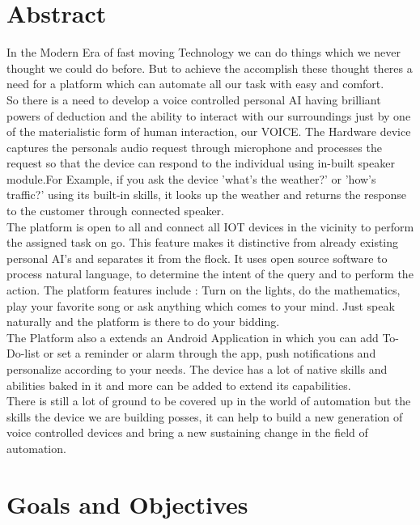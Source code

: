 \documentclass[oneside,a4paper,12pt]{article}
\begin{document}
\section{Abstract}
In the Modern Era of fast moving Technology we can do things which we never thought we could do before. But to achieve the accomplish these thought theres a need for a platform which can automate all our task with easy and comfort.\\

So there is a need to develop a voice controlled personal AI having brilliant powers of deduction and the ability to interact with our surroundings just by one of the materialistic form of human interaction, our VOICE. The Hardware device captures the personals audio request through microphone and  processes the request so that the device can respond to the individual using in-built speaker module.For Example, if you ask the device 'what's the weather?' or 'how's traffic?' using its built-in skills, it looks up the weather and returns the response to the customer through connected speaker.\\

\noindent
The platform is open to all and connect all IOT devices in the vicinity to perform the assigned task on go. This feature makes it distinctive from already existing personal AI’s and separates it from the flock. It uses open source software to process natural language, to determine the intent of the query and to perform the action. The platform features include : Turn on the lights, do the mathematics, play your favorite song or ask anything which comes to your mind. Just speak naturally and the platform is there to do your bidding.\\

\noindent
The Platform also a extends an Android Application in which you can add To-Do-list or set a reminder or alarm through the app, push notifications and personalize according to your needs. The device has a lot of native skills and abilities baked in it and more can be added to extend its capabilities.\\

\noindent
There is still a lot of ground to be covered up in the world of automation but the skills the device we are building posses, it can help to build a new generation of voice controlled devices and bring a new  sustaining change in the field of automation.\\

\section{Goals and Objectives}
\end{document}
